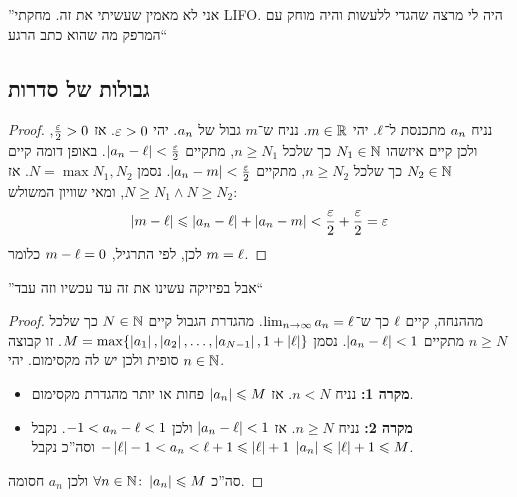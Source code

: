 \documentclass[name=רשימות חשבון דיפרנציאלי ואינטגרלי 1א]{../../../tex/classes/megasumPreamble}
\begin{document}
	''אני לא מאמין שעשיתי את זה. מחקתי LIFO. היה לי מרצה שהגדי ללעשות והיה מוחק עם המרפק מה שהוא כתב הרגע``

	\subsection{גבולות של סדרות}
	\begin{proof}
		נניח $a_n$ מתכנסת ל־$\ell$. יהי $m \in \mathbb{R}$. נניח ש־$m$ גבול של $a_n$. יהי $\eg > 0$. אז $\frac{\eg}{2} > 0$, ולכן קיים איזשהו $N_1 \in \mathbb{N}$ כך שלכל $n \ge N_1$, מתקיים $\sof{a_n - \ml} < \frac{\eg}{2}$. באופן דומה קיים $N_2 \in \mathbb{N}$ כך שלכל $n \ge N_2$, מתקיים $\sof{a_n - m} < \frac{\eg}{2}$. נסמן $N = \max{N_1, N_2}$. אז $N \ge N_1 \land N \ge N_2$, ומאי שוויון המשולש:
		\[ \sof{m - \ml} \le \sof{a_n - \ml} + \sof{a_n - m} < \frac{\eg}{2} + \frac{\eg}{2} = \eg \]
		לכן, לפי התרגיל, $m - \ell = 0$ כלומר $m = \ell$.
	\end{proof}
	''אבל בפיזיקה עשינו את זה עד עכשיו וזה עבד``

	\begin{proof}
		מההנחה, קיים $\ell$ כך ש־$\lim_{n \to \infty} a_n = \ell$. מהגדרת הגבול קיים $N \in \mathbb{N}$ כך שלכל $n \ge N$ מתקיים $\left \lvert a_n - \ell \right \rvert < 1$. נסמן $M = \max\{\left \lvert a_1 \right \rvert, \left \lvert a_2 \right \rvert, \dots, \left \lvert a_{N - 1} \right \rvert, 1 + \left \lvert \ell \right \rvert\}$. זו קבוצה סופית ולכן יש לה מקסימום. יהי $n \in \mathbb{N}$.
		\begin{itemize}
			\item \textbf{מקרה 1: }נניח $n < N$. אז $\left \lvert a_n \right \rvert \leqslant M$ פחות או יותר מהגדרת מקסימום.
			\item \textbf{מקרה 2: }נניח $n \ge N$. אז $\left \lvert a_n - \ell \right \rvert < 1$ ולכן $-1 < a_n - \ell < 1$. נקבל $-\left \lvert \ell \right \rvert - 1 < a_n < \ell + 1 \leqslant \left \lvert \ell \right \rvert + 1$ וסה''כ נקבל $\left \lvert a_n \right \rvert \leqslant \left \lvert \ell \right \rvert + 1 \leqslant M$.
		\end{itemize}
		סה''כ $\forall n \in \mathbb{N} \colon \left \lvert a_n \right \rvert \leqslant M$ ולכן $a_n$ חסומה.
	\end{proof}
\end{document}
